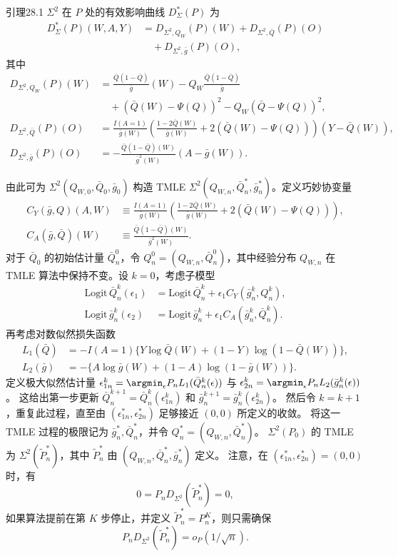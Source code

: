 \begin{bookresult}{引理}{28.1}
$\Sigma^2$ 在 $P$ 处的有效影响曲线 $D_\Sigma^*(P)$ 为
\[
\begin{aligned}
 D_\Sigma^*(P)(W,A,Y)
 &=D_{\Sigma^2,Q_W}(P)(W)
 +D_{\Sigma^2,\bar Q}(P)(O)\\
 &\quad+D_{\Sigma^2,\bar g}(P)(O),
\end{aligned}
\]
其中
\[
\begin{aligned}
 D_{\Sigma^2,Q_W}(P)(W)
 &=\frac{\bar Q(1-\bar Q)}{\bar g}(W)
 -Q_W\frac{\bar Q(1-\bar Q)}{\bar g}\\
 &\quad+(\bar Q(W)-\Psi(Q))^2
 -Q_W(\bar Q-\Psi(Q))^2,\\[.4em]
 D_{\Sigma^2,\bar Q}(P)(O)
 &=\frac{I(A=1)}{\bar g(W)}
 \left(\frac{1-2\bar Q(W)}{\bar g(W)}
 +2(\bar Q(W)-\Psi(Q))\right)(Y-\bar Q(W)),\\[.4em]
 D_{\Sigma^2,\bar g}(P)(O)
 &=-\frac{\bar Q(1-\bar Q)(W)}{\bar g^2(W)}(A-\bar g(W)).
\end{aligned}
\]
\end{bookresult}

由此可为 $\Sigma^2(Q_{W,0},\bar Q_0,\bar g_0)$ 构造 TMLE
$\Sigma^2(Q_{W,n},\bar Q_n^*,\bar g_n^*)$。定义巧妙协变量
\[
\begin{aligned}
 C_Y(\bar g,Q)(A,W)
 &\equiv\frac{I(A=1)}{\bar g(W)}
 \left(\frac{1-2\bar Q(W)}{\bar g(W)}
 +2(\bar Q(W)-\Psi(Q))\right),\\
 C_A(\bar g,\bar Q)(W)
 &\equiv\frac{\bar Q(1-\bar Q)(W)}{\bar g^2(W)}.
\end{aligned}
\]
对于 $\bar Q_0$ 的初始估计量 $\bar Q_n^0$，令
$Q_n^0=(Q_{W,n},\bar Q_n^0)$，其中经验分布 $Q_{W,n}$ 在 TMLE 算法中保持不变。设 $k=0$，考虑子模型
\[
\begin{aligned}
 \mathrm{Logit}\,\bar Q_n^k(\epsilon_1)
 &=\mathrm{Logit}\,\bar Q_n^k+\epsilon_1C_Y(\bar g_n^k,Q_n^k),\\
 \mathrm{Logit}\,\bar g_n^k(\epsilon_2)
 &=\mathrm{Logit}\,\bar g_n^k+\epsilon_1C_A(\bar g_n^k,\bar Q_n^k).
\end{aligned}
\]
再考虑对数似然损失函数
\[
\begin{aligned}
 L_1(\bar Q)&=-I(A=1)\{Y\log\bar Q(W)+(1-Y)\log(1-\bar Q(W))\},\\
 L_2(\bar g)&=-\{A\log\bar g(W)+(1-A)\log(1-\bar g(W))\}.
\end{aligned}
\]
定义极大似然估计量
$\epsilon_{1n}^k=\argmin_\epsilon P_nL_1(\bar Q_n^k(\epsilon))$
与 $\epsilon_{2n}^k=\argmin_\epsilon P_nL_2(\bar g_n^k(\epsilon))$。
这给出第一步更新
$\bar Q_n^{k+1}=\bar Q_n^k(\epsilon_{1n}^k)$ 和
$\bar g_n^{k+1}=\bar g_n^k(\epsilon_{2n}^k)$。
然后令 $k=k+1$，重复此过程，直至由 $(\epsilon_{1n}^*,\epsilon_{2n}^*)$ 足够接近 $(0,0)$ 所定义的收敛。
将这一 TMLE 过程的极限记为 $\bar g_n^*,\bar Q_n^*$，并令
$Q_n^*=(Q_{W,n},\bar Q_n^*)$。
$\Sigma^2(P_0)$ 的 TMLE 为 $\Sigma^2(\tilde P_n^*)$，其中
$\tilde P_n^*$ 由 $(Q_{W,n},\bar Q_n^*,\bar g_n^*)$ 定义。
注意，在 $(\epsilon_{1n}^*,\epsilon_{2n}^*)=(0,0)$ 时，有
\[
 0=P_nD_{\Sigma^2}(\tilde P_n^*)=0,
\]
如果算法提前在第 $K$ 步停止，并定义 $\tilde P_n^*=P_n^K$，则只需确保
\[
 P_nD_{\Sigma^2}(\tilde P_n^*)=o_P(1/\sqrt n).
\]


